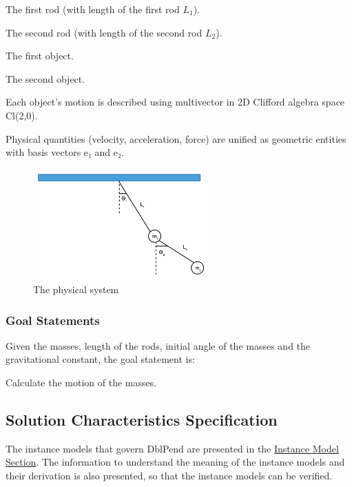 \documentclass[12pt]{article}
\begin{document}
{\begin{description}[font=\normalfont]
\item[PS1:]{The first rod (with length of the first rod ${L_{1}}$).}
\item[PS2:]{The second rod (with length of the second rod ${L_{2}}$).}
\item[PS3:]{The first object.}
\item[PS4:]{The second object.}
\item[PS5:]{Each object's motion is described using multivector in 2D Clifford algebra space Cl(2,0).}
\item[PS6:]{Physical quantities (velocity, acceleration, force) are unified as geometric entities with basis vectors e₁ and e₂.}
\end{description}
\begin{figure}[H]
\begin{center}
\includegraphics[width=0.6\textwidth]{../../../../datafiles/dblpend/dblpend.png}
\caption{The physical system}
\label{Figure:dblpend}
\end{center}
\end{figure}
\subsubsection{Goal Statements}
\label{Sec:GoalStmt}
Given the masses, length of the rods, initial angle of the masses and the gravitational constant, the goal statement is:

\begin{description}[font=\normalfont]
\item[motionMass:\phantomsection\label{motionMass}]{Calculate the motion of the masses.}
\end{description}
\subsection{Solution Characteristics Specification}
\label{Sec:SolCharSpec}
The instance models that govern DblPend are presented in the \hyperref[Sec:IMs]{Instance Model Section}. The information to understand the meaning of the instance models and their derivation is also presented, so that the instance models can be verified.

}
\end{document}
